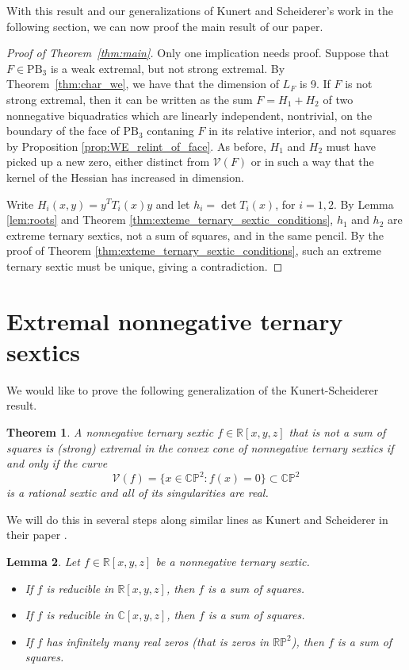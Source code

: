 \documentclass[a4paper]{article}
\numberwithin{equation}{section}
\newcommand{\R}{\mathbb{R}}
\newcommand{\C}{\mathbb{C}}
\renewcommand{\P}{\mathbb{P}}
\newcommand{\V}{\mathcal{V}}
\newtheorem{theorem}{Theorem}[section]
\newtheorem{lemma}[theorem]{Lemma}
\theoremstyle{definition}
\theoremstyle{remark}
\begin{document}
With this result and our generalizations of Kunert and Scheiderer's work in the following section, we can now proof the main result of our paper.

\begin{proof}[Proof of Theorem~\ref{thm:main}]
Only one implication needs proof. Suppose that $F\in\mathrm{PB}_3$ is a weak extremal, but not strong extremal. By Theorem~\ref{thm:char_we}, we have that the dimension of $L_F$ is 9.  
If $F$ is not strong extremal, then it can be written as the sum $F = H_1 + H_2$ of two nonnegative biquadratics which are linearly independent, nontrivial, on the boundary of the face of $\mathrm{PB}_3$ contaning $F$ in its relative interior, and not squares by Proposition \ref{prop:WE_relint_of_face}.   
As before, $H_1$ and $H_2$ must have picked up a new zero, either distinct from $\V(F)$ or in such a way that the kernel of the Hessian has increased in dimension.


Write $H_i(x,y) = y^TT_i(x)y$ and let $h_i = \det T_i(x)$, for $i = 1,2$. 
By Lemma \ref{lem:roots} and Theorem \ref{thm:exteme_ternary_sextic_conditions}, $h_1$ and $h_2$ are extreme ternary sextics, not a sum of squares, and in the same pencil.  By the proof of Theorem \ref{thm:exteme_ternary_sextic_conditions}, such an extreme ternary sextic must be unique, giving a contradiction.
\end{proof}

\section{Extremal nonnegative ternary sextics}\label{sec:ternary_sextics}
We would like to prove the following generalization of the Kunert-Scheiderer result.
\begin{theorem}\label{thm:KS_generalization}
A nonnegative ternary sextic $f\in \R[x,y,z]$ that is not a sum of squares is (strong) extremal in the convex cone of nonnegative ternary sextics if and only if the curve 
\[
\V(f) = \{x\in \C\P^2\colon f(x) = 0\} \subset \C\P^2
\]
is a rational sextic and all of its singularities are real. 
\end{theorem}

We will do this in several steps along similar lines as Kunert and Scheiderer in their paper \cite{KS2018}.
\begin{lemma}\label{lem:ternary6SOS}
Let $f\in\R[x,y,z]$ be a nonnegative ternary sextic. 
\begin{itemize}
    \item If $f$ is reducible in $\R[x,y,z]$, then $f$ is a sum of squares.
    \item If $f$ is reducible in $\C[x,y,z]$, then $f$ is a sum of squares.
    \item If $f$ has infinitely many real zeros (that is zeros in $\R\P^2$), then $f$ is a sum of squares.
\end{itemize}
\end{lemma}
\end{document}
